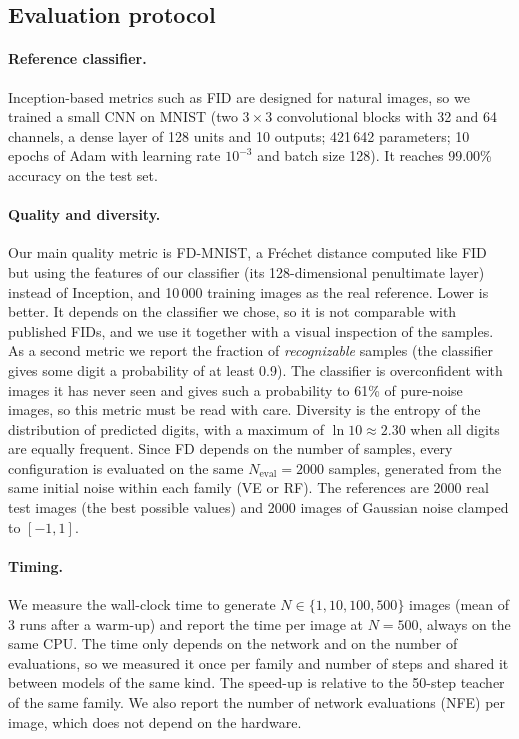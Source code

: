 \documentclass{article}
\begin{document}
\subsection{Evaluation protocol}
\label{sec:evaluation}

\paragraph{Reference classifier.} Inception-based metrics such as FID are
designed for natural images, so we trained a small CNN on MNIST (two $3\times3$
convolutional blocks with 32 and 64 channels, a dense layer of 128 units and 10
outputs; 421\,642 parameters; 10 epochs of Adam with learning rate $10^{-3}$ and
batch size 128). It reaches 99.00\% accuracy on the test set.

\paragraph{Quality and diversity.} Our main quality metric is FD-MNIST, a
Fréchet distance computed like FID~\cite{heusel2017fid} but using the features of
our classifier (its 128-dimensional penultimate layer) instead of Inception, and
10\,000 training images as the real reference. Lower is better. It depends on
the classifier we chose, so it is not comparable with published FIDs, and we use
it together with a visual inspection of the samples. As a second metric we report
the fraction of \emph{recognizable} samples (the classifier gives some digit a
probability of at least 0.9). The classifier is overconfident with images it has
never seen and gives such a probability to 61\% of pure-noise images, so this
metric must be read with care. Diversity is the entropy of the distribution of
predicted digits, with a maximum of $\ln 10 \approx 2.30$ when all digits are
equally frequent. Since FD depends on the number of samples, every configuration
is evaluated on the same $N_\text{eval} = 2000$ samples, generated from the same
initial noise within each family (VE or RF). The references are 2000 real test
images (the best possible values) and 2000 images of Gaussian noise clamped to
$[-1, 1]$.

\paragraph{Timing.} We measure the wall-clock time to generate
$N \in \{1, 10, 100, 500\}$ images (mean of 3 runs after a warm-up) and report
the time per image at $N = 500$, always on the same CPU. The time only depends on
the network and on the number of evaluations, so we measured it once per family
and number of steps and shared it between models of the same kind. The speed-up
is relative to the 50-step teacher of the same family. We also report the number
of network evaluations (NFE) per image, which does not depend on the hardware.
\end{document}
